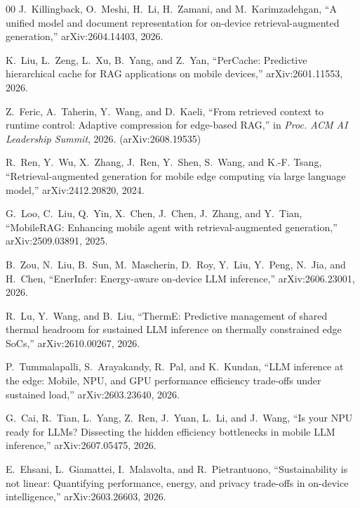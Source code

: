 \documentclass[journal]{IEEEtran}
\begin{document}
\begin{thebibliography}{00}
J.~Killingback, O.~Meshi, H.~Li, H.~Zamani, and M.~Karimzadehgan, ``A unified
model and document representation for on-device retrieval-augmented
generation,'' arXiv:2604.14403, 2026.

K.~Liu, L.~Zeng, L.~Xu, B.~Yang, and Z.~Yan, ``PerCache: Predictive
hierarchical cache for RAG applications on mobile devices,''
arXiv:2601.11553, 2026.

Z.~Feric, A.~Taherin, Y.~Wang, and D.~Kaeli, ``From retrieved context to
runtime control: Adaptive compression for edge-based RAG,'' in \emph{Proc. ACM
AI Leadership Summit}, 2026. (arXiv:2608.19535)

R.~Ren, Y.~Wu, X.~Zhang, J.~Ren, Y.~Shen, S.~Wang, and K.-F. Tsang,
``Retrieval-augmented generation for mobile edge computing via large language
model,'' arXiv:2412.20820, 2024.

G.~Loo, C.~Liu, Q.~Yin, X.~Chen, J.~Chen, J.~Zhang, and Y.~Tian, ``MobileRAG:
Enhancing mobile agent with retrieval-augmented generation,''
arXiv:2509.03891, 2025.

B.~Zou, N.~Liu, B.~Sun, M.~Mascherin, D.~Roy, Y.~Liu, Y.~Peng, N.~Jia, and
H.~Chen, ``EnerInfer: Energy-aware on-device LLM inference,''
arXiv:2606.23001, 2026.

R.~Lu, Y.~Wang, and B.~Liu, ``ThermE: Predictive management of shared thermal
headroom for sustained LLM inference on thermally constrained edge SoCs,''
arXiv:2610.00267, 2026.

P.~Tummalapalli, S.~Arayakandy, R.~Pal, and K.~Kundan, ``LLM inference at the
edge: Mobile, NPU, and GPU performance efficiency trade-offs under sustained
load,'' arXiv:2603.23640, 2026.

G.~Cai, R.~Tian, L.~Yang, Z.~Ren, J.~Yuan, L.~Li, and J.~Wang, ``Is your NPU
ready for LLMs? Dissecting the hidden efficiency bottlenecks in mobile LLM
inference,'' arXiv:2607.05475, 2026.

E.~Ehsani, L.~Giamattei, I.~Malavolta, and R.~Pietrantuono, ``Sustainability
is not linear: Quantifying performance, energy, and privacy trade-offs in
on-device intelligence,'' arXiv:2603.26603, 2026.

\end{thebibliography}
\end{document}
